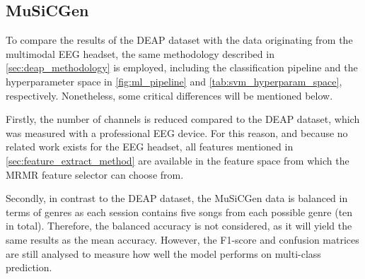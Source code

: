    \subsection{MuSiCGen}
      To compare the results of the \ac{DEAP} dataset with the data originating from the multimodal \ac{EEG} headset, the same methodology described in \autoref{sec:deap_methodology} is employed, including the classification pipeline and the hyperparameter space in \autoref{fig:ml_pipeline} and \autoref{tab:svm_hyperparam_space}, respectively. Nonetheless, some critical differences will be mentioned below.\par
      Firstly, the number of channels is reduced compared to the \ac{DEAP} dataset, which was measured with a professional \ac{EEG} device. For this reason, and because no related work exists for the \ac{EEG} headset, all features mentioned in \autoref{sec:feature_extract_method} are available in the feature space from which the \ac{MRMR} feature selector can choose from.\par
      Secondly, in contrast to the \ac{DEAP} dataset, the \ac{MuSiCGen} data is balanced in terms of genres as each session contains five songs from each possible genre (ten in total). Therefore, the balanced accuracy is not considered, as it will yield the same results as the mean accuracy. However, the F1-score and confusion matrices are still analysed to measure how well the model performs on multi-class prediction. \par
